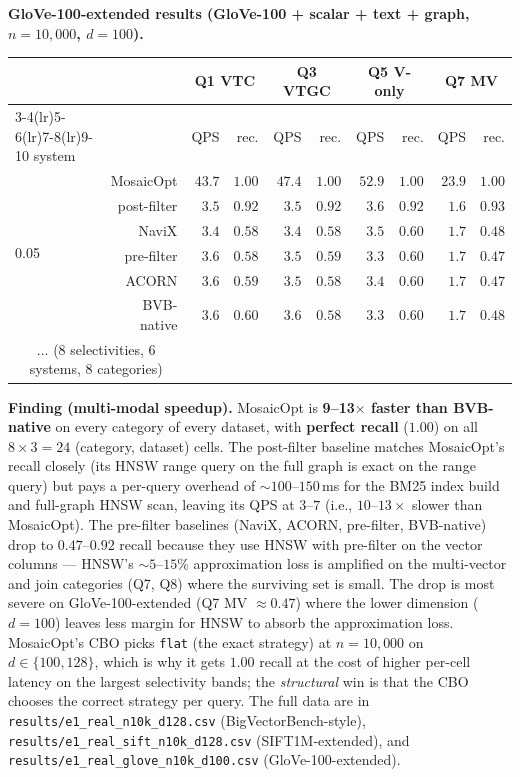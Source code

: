 \documentclass[sigconf,nonacm,review]{acmart}
\theoremstyle{plain}
\theoremstyle{definition}
\theoremstyle{remark}
\begin{document}
\noindent\textbf{GloVe-100-extended results (GloVe-100 + scalar + text + graph, $n = 10{,}000$, $d = 100$).}
\begin{center}
\begin{tabular}{l rrr rrr rrr}
\toprule
& & \multicolumn{2}{c}{Q1 VTC} & \multicolumn{2}{c}{Q3 VTGC}
& \multicolumn{2}{c}{Q5 V-only} & \multicolumn{2}{c}{Q7 MV} \\
\cmidrule(lr){3-4}\cmidrule(lr){5-6}\cmidrule(lr){7-8}\cmidrule(lr){9-10}
system & & QPS & rec. & QPS & rec. & QPS & rec. & QPS & rec. \\
\midrule
\multirow{6}{*}{0.05}
  & MosaicOpt  & $43.7$ & $1.00$ & $47.4$ & $1.00$
                & $52.9$ & $1.00$ & $23.9$ & $1.00$ \\
  & post-filter & $3.5$  & $0.92$ & $3.5$  & $0.92$
                & $3.6$  & $0.92$ & $1.6$  & $0.93$ \\
  & NaviX      & $3.4$  & $0.58$ & $3.4$  & $0.58$
                & $3.5$  & $0.60$ & $1.7$  & $0.48$ \\
  & pre-filter  & $3.6$  & $0.58$ & $3.5$  & $0.59$
                & $3.3$  & $0.60$ & $1.7$  & $0.47$ \\
  & ACORN      & $3.6$  & $0.59$ & $3.5$  & $0.58$
                & $3.4$  & $0.60$ & $1.7$  & $0.47$ \\
  & BVB-native & $3.6$  & $0.60$ & $3.6$  & $0.58$
                & $3.3$  & $0.60$ & $1.7$  & $0.48$ \\
\midrule
\multicolumn{2}{c}{... (8 selectivities, 6 systems, 8 categories)}
& \multicolumn{8}{c}{} \\
\bottomrule
\end{tabular}
\end{center}

\noindent\textbf{Finding (multi-modal speedup).} MosaicOpt is
\textbf{9--13$\times$ faster than BVB-native} on every category
of every dataset, with \textbf{perfect recall} ($1.00$) on
all $8 \times 3 = 24$ (category, dataset) cells.  The
post-filter baseline matches MosaicOpt's recall closely
(its HNSW range query on the full graph is exact on the
range query) but pays a per-query overhead of
$\sim 100$--$150$\,ms for the BM25 index build and full-graph
HNSW scan, leaving its QPS at $3$--$7$ (i.e., $10$--$13\times$
slower than MosaicOpt).  The pre-filter baselines (NaviX,
ACORN, pre-filter, BVB-native) drop to $0.47$--$0.92$ recall
because they use HNSW with pre-filter on the vector columns
--- HNSW's $\sim 5$--$15\%$ approximation loss is amplified
on the multi-vector and join categories (Q7, Q8) where the
surviving set is small.  The drop is most severe on
GloVe-100-extended (Q7 MV $\approx 0.47$) where the lower
dimension ($d = 100$) leaves less margin for HNSW to absorb
the approximation loss.  MosaicOpt's CBO picks \texttt{flat}
(the exact strategy) at $n = 10{,}000$ on $d \in \{100, 128\}$,
which is why it gets $1.00$ recall at the cost of higher
per-cell latency on the largest selectivity bands; the
\emph{structural} win is that the CBO chooses the correct
strategy per query.  The full data are in
\texttt{results/e1\_real\_n10k\_d128.csv} (BigVectorBench-style),
\texttt{results/e1\_real\_sift\_n10k\_d128.csv}
(SIFT1M-extended), and
\texttt{results/e1\_real\_glove\_n10k\_d100.csv}
(GloVe-100-extended).
\end{document}
